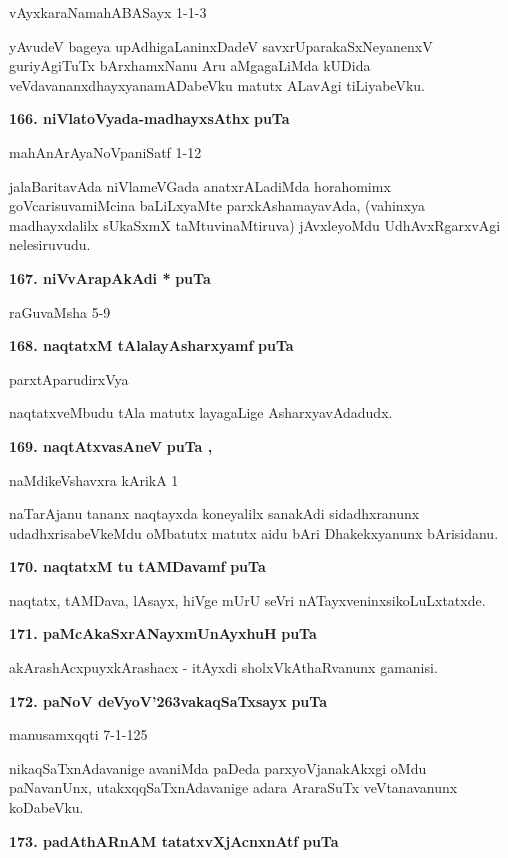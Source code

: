 \hfill{vAyxkaraNamahABASayx 1-1-3}

\smallskip
yAvudeV bageya upAdhigaLaninxDadeV savxrUparakaSxNeyanenxV guriyAgiTuTx bArxhamxNanu Aru aMga\-gaLiMda kUDida veVdavananxdhayxyanamADabeVku matutx ALavAgi tiLiyabeVku.

\medskip
\noindent
\textbf{166. niVlatoVyada-madhayxsAthx} \hfill{\bf puTa \pageref{166}}

\hfill{mahAnArAyaNoVpaniSatf 1-12}

\smallskip
jalaBaritavAda niVlameVGada anatxrALadiMda horahomimx goVcarisuva\break miMcina baLiLxyaMte parxkAsha\-mayavAda, (vahinxya madhayxdalilx sUkaSxmX taMtu\-vinaM\-tiruva) jAvxleyoMdu UdhAvxRgarxvAgi nelesiru\-vudu.

\medskip
\noindent
\textbf{167. niVvArapAkAdi *} \hfill{\bf puTa \pageref{57}}

\hfill{raGuvaMsha 5-9}

\eject

\noindent
\textbf{168. naqtatxM tAlalayAsharxyamf} \hfill{\bf puTa \pageref{249}}

\hfill{parxtAparudirxVya}

\smallskip
naqtatxveMbudu tAla matutx layagaLige AsharxyavAdadudx.

\medskip
\noindent
\textbf{169. naqtAtxvasAneV} \hfill{\bf puTa \pageref{40}, \pageref{152}}

\hfill{naMdikeVshavxra kArikA 1}

\smallskip
naTarAjanu tananx naqtayxda koneyalilx sanakAdi sidadhxranunx udadhxrisabeVkeMdu oMbatutx matutx aidu bAri Dhakekxyanunx bArisidanu.

\medskip
\noindent
\textbf{170. naqtatxM tu tAMDavamf} \hfill{\bf puTa \pageref{241}}

\smallskip
naqtatx, tAMDava, lAsayx, hiVge mUrU seVri nATayxveninxsikoLuLxtatxde.

\medskip
\noindent
\textbf{171. paMcAkaSxrANayxmUnAyxhuH} \hfill{\bf puTa \pageref{161}}

\smallskip
akArashAcxpuyxkArashacx - itAyxdi sholxVkAthaRvanunx gamanisi.

\medskip
\noindent
\textbf{172. paNoV deVyoV\char'263vakaqSaTxsayx} \hfill{\bf puTa \pageref{223}}

\hfill{manusamxqqti 7-1-125}

\smallskip
nikaqSaTxnAdavanige avaniMda paDeda parxyoVjanakAkxgi oMdu paNavanUnx, utakxqqSaTxnAdavanige adara AraraSuTx veVtanavanunx koDabeVku.

\medskip
\noindent
\textbf{173. padAthARnAM tatatxvXjAcnxnAtf} \hfill{\bf puTa \pageref{41}}

